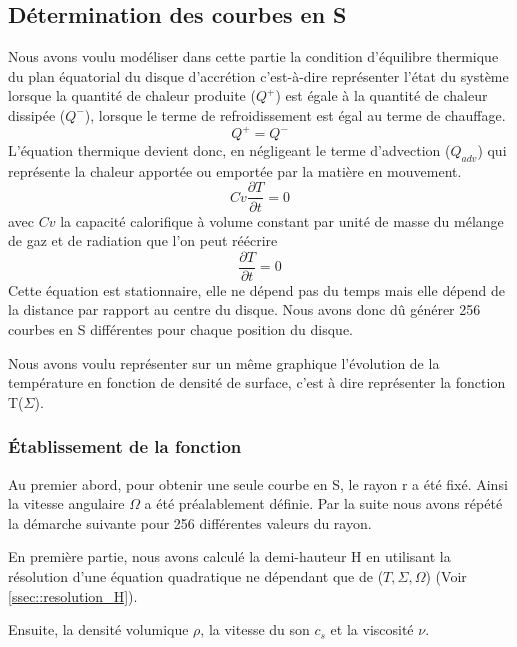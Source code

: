 \subsection{Détermination des courbes en S}
\label{sec:courbe_s}

Nous avons voulu modéliser dans cette partie la condition d'équilibre thermique du plan équatorial du disque d'accrétion c'est-à-dire représenter l'état du système lorsque la quantité de chaleur produite ($Q^+$) est égale à la quantité de chaleur dissipée ($Q^-$), lorsque le terme de refroidissement est égal au terme de chauffage.
\begin{equation}
Q^+ = Q^-
\end{equation}
L'équation thermique devient donc, en négligeant le terme d'advection ($Q_{adv}$) qui représente la chaleur apportée ou emportée par la matière en mouvement.
\begin{equation}
Cv\frac{\partial T}{\partial t} = 0
\end{equation}
avec $Cv$ la capacité calorifique à volume constant par unité de masse du mélange de gaz et de radiation que l'on peut réécrire
\begin{equation}
\frac{\partial T}{\partial t} = 0
\end{equation}
Cette équation est stationnaire, elle ne dépend pas du temps mais elle dépend de la distance par rapport au centre du disque. Nous avons donc dû générer 256 courbes en S différentes pour chaque position du disque.

Nous avons voulu représenter sur un même graphique l'évolution de la température en fonction de densité de surface, c'est à dire représenter la fonction T($\Sigma$).
   
\subsubsection{Établissement de la fonction}

Au premier abord, pour obtenir une seule courbe en S, le rayon r a été fixé. Ainsi la vitesse angulaire $\Omega$ a été préalablement définie. Par la suite nous avons répété la démarche suivante pour 256 différentes valeurs du rayon.

En première partie, nous avons calculé la demi-hauteur H en utilisant la résolution d'une équation quadratique ne dépendant que de ($T,\Sigma,\Omega$) (Voir \ref{ssec::resolution_H}).

Ensuite, la densité volumique $\rho$, la vitesse du son $c_s$ et la viscosité $\nu$. 

